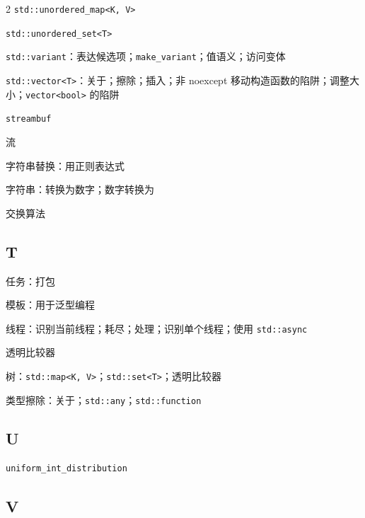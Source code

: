 \begin{multicols}{2}
\noindent \texttt{std::\allowbreak{}unordered\_\allowbreak{}map<\allowbreak{}K,\allowbreak{} V>\allowbreak{}}\par
\noindent \texttt{std::\allowbreak{}unordered\_\allowbreak{}set<\allowbreak{}T>\allowbreak{}}\par
\noindent \texttt{std::\allowbreak{}variant}：表达候选项；\texttt{make\_\allowbreak{}variant}；值语义；访问变体\par
\noindent \texttt{std::\allowbreak{}vector<\allowbreak{}T>\allowbreak{}}：关于；擦除；插入；非 noexcept 移动构造函数的陷阱；调整大小；\texttt{vector<\allowbreak{}bool>\allowbreak{}} 的陷阱\par
\noindent \texttt{streambuf}\par
\noindent 流\par
\noindent 字符串替换：用正则表达式\par
\noindent 字符串：转换为数字；数字转换为\par
\noindent 交换算法\par

\subsection*{T}

\noindent 任务：打包\par
\noindent 模板：用于泛型编程\par
\noindent 线程：识别当前线程；耗尽；处理；识别单个线程；使用 \texttt{std::\allowbreak{}async}\par
\noindent 透明比较器\par
\noindent 树：\texttt{std::\allowbreak{}map<\allowbreak{}K,\allowbreak{} V>\allowbreak{}}；\texttt{std::\allowbreak{}set<\allowbreak{}T>\allowbreak{}}；透明比较器\par
\noindent 类型擦除：关于；\texttt{std::\allowbreak{}any}；\texttt{std::\allowbreak{}function}\par

\subsection*{U}

\noindent \texttt{uniform\_\allowbreak{}int\_\allowbreak{}distribution}\par

\subsection*{V}


\end{multicols}
